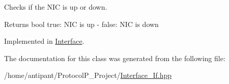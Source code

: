 Checks if the N\-I\-C is up or down. 

\begin{DoxyReturn}{Returns}
bool true\-: N\-I\-C is up -\/ false\-: N\-I\-C is down 
\end{DoxyReturn}


Implemented in \hyperlink{classInterface_a99298b5fd1fbec6d8da500a356921652}{Interface}.



The documentation for this class was generated from the following file\-:\begin{DoxyCompactItemize}
\item 
/home/antipant/\-Protocol\-P\-\_\-\-Project/\hyperlink{Interface__If_8hpp}{Interface\-\_\-\-If.\-hpp}\end{DoxyCompactItemize}
